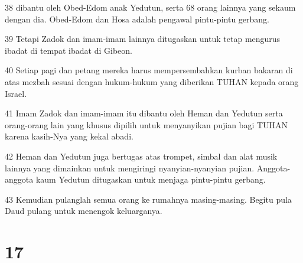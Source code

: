 \par 38 dibantu oleh Obed-Edom anak Yedutun, serta 68 orang lainnya yang sekaum dengan dia. Obed-Edom dan Hosa adalah pengawal pintu-pintu gerbang.
\par 39 Tetapi Zadok dan imam-imam lainnya ditugaskan untuk tetap mengurus ibadat di tempat ibadat di Gibeon.
\par 40 Setiap pagi dan petang mereka harus mempersembahkan kurban bakaran di atas mezbah sesuai dengan hukum-hukum yang diberikan TUHAN kepada orang Israel.
\par 41 Imam Zadok dan imam-imam itu dibantu oleh Heman dan Yedutun serta orang-orang lain yang khusus dipilih untuk menyanyikan pujian bagi TUHAN karena kasih-Nya yang kekal abadi.
\par 42 Heman dan Yedutun juga bertugas atas trompet, simbal dan alat musik lainnya yang dimainkan untuk mengiringi nyanyian-nyanyian pujian. Anggota-anggota kaum Yedutun ditugaskan untuk menjaga pintu-pintu gerbang.
\par 43 Kemudian pulanglah semua orang ke rumahnya masing-masing. Begitu pula Daud pulang untuk menengok keluarganya.

\chapter{17}


